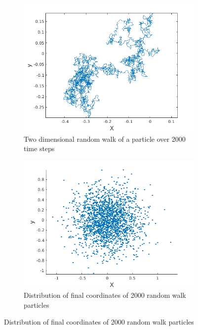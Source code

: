 \documentclass[a4paper]{article}
\begin{document}
		\begin{figure} [h]
			\begin{subfigure} {.475\columnwidth}
				\includegraphics[width=\columnwidth]{../plots/1aa_randomwalk.png}
				\caption{Two dimensional random walk of a particle over 2000 time steps}
				\label{fig:1a}
			\end{subfigure}%
			\hfill
			\begin{subfigure} {.475\columnwidth}
				\includegraphics[width=\columnwidth]{../plots/1ab_randomwalk.png}
				\caption{Distribution of final coordinates of 2000 random walk particles}
				\label{fig:1b}
			\end{subfigure}
			

\end{figure}
\end{document}
